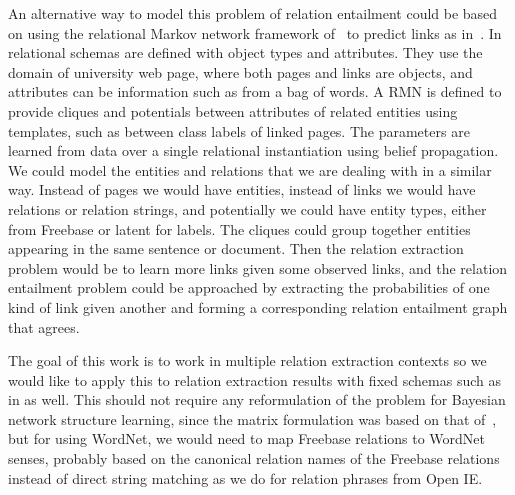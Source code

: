 \documentclass{article}
\begin{document}
An alternative way to model this problem of relation entailment could be based on using the relational Markov network framework of~\cite{Taskar:2002:DPM:2073876.2073934} to predict links as in~\cite{TaskarWAK03}. In~\cite{TaskarWAK03} relational schemas are defined with object types and attributes. They use the domain of university web page, where both pages and links are objects, and attributes can be information such as from a bag of words. A RMN is defined to provide cliques and potentials between attributes of related entities using templates, such as between class labels of linked pages. The parameters are learned from data over a single relational instantiation using belief propagation. We could model the entities and relations that we are dealing with in a similar way. Instead of pages we would have entities, instead of links we would have relations or relation strings, and potentially we could have entity types, either from Freebase or latent for labels. The cliques could group together entities appearing in the same sentence or document. Then the relation extraction problem would be to learn more links given some observed links, and the relation entailment problem could be approached by extracting the probabilities of one kind of link given another and forming a corresponding relation entailment graph that agrees.

The goal of this work is to work in multiple relation extraction contexts so we would like to apply this to relation extraction results with fixed schemas such as in \cite{HoffmannZLZW11, riedel13relation} as well. This should not require any reformulation of the problem for Bayesian network structure learning, since the matrix formulation was based on that of~\cite{riedel13relation}, but for using WordNet, we would need to map Freebase relations to WordNet senses, probably based on the canonical relation names of the Freebase relations instead of direct string matching as we do for relation phrases from Open IE.



\end{document}
